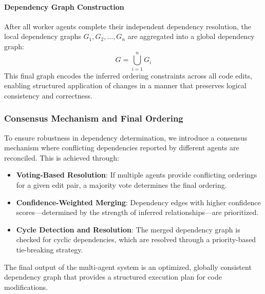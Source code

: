 \paragraph{Dependency Graph Construction}
After all worker agents complete their independent dependency resolution, the local dependency graphs \( G_1, G_2, \dots, G_n \) are aggregated into a global dependency graph:
\[
G = \bigcup_{i=1}^{n} G_i
\]
This final graph encodes the inferred ordering constraints across all code edits, enabling structured application of changes in a manner that preserves logical consistency and correctness.

\subsubsection{Consensus Mechanism and Final Ordering}

To ensure robustness in dependency determination, we introduce a consensus mechanism where conflicting dependencies reported by different agents are reconciled. This is achieved through:

\begin{itemize}
    \item \textbf{Voting-Based Resolution}: If multiple agents provide conflicting orderings for a given edit pair, a majority vote determines the final ordering.
    \item \textbf{Confidence-Weighted Merging}: Dependency edges with higher confidence scores—determined by the strength of inferred relationships—are prioritized.
    \item \textbf{Cycle Detection and Resolution}: The merged dependency graph is checked for cyclic dependencies, which are resolved through a priority-based tie-breaking strategy.
\end{itemize}

The final output of the multi-agent system is an optimized, globally consistent dependency graph that provides a structured execution plan for code modifications.

